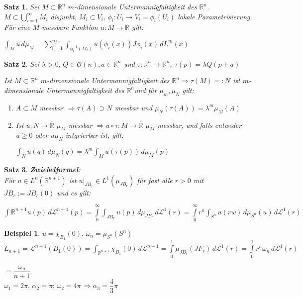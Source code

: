 \documentclass[11pt]{memoir}
\theoremstyle{changebreak}
\newtheorem{Beispiel}{Beispiel}[chapter]
\newtheorem{Satz}{Satz}[chapter]
\newcommand{\umgf}{$m$-dimensionale Untermannigfaltigkeit des $\mathbb R^n$}
\begin{document}
\begin{Satz}
Sei $M \subset \mathbb R^n$ \umgf. $M \subset \bigcup\limits_{i=1}^\infty M_i$ disjunkt, $M_i \subset V_i, \, \phi_i: U_i \rightarrow V_i = \phi_i(U_i)$ lokale Parametrisierung. Für eine $M$-messbare Funktion $u: M \rightarrow \overline{\mathbb R}$ gilt:
\begin{center}
	$\int_M u \, d\mu_M = \sum\limits_{i=1}^\infty \int_{\phi_i^{-1}(M_i)} u(\phi_i(x))J\phi_i(x) \, dL^m(x)$
\end{center}
\end{Satz}

\begin{Satz}
Sei $\lambda > 0, \, Q \in \mathscr O(n), a \in \mathbb R^n$ und $\tau: \mathbb R^n \rightarrow \mathbb R^n$, $\tau(p) = \lambda Q(p+a)$
\par
Ist $M \subset \mathbb R^n$ \umgf $\Rightarrow \tau(M) =: N$ ist \umgf und für $\mu_m, \mu_N$ gilt:
\begin{enumerate}
	\item $A \subset M$ messbar $\Rightarrow \tau(A) \supset N$ messbar und $\mu_N (\tau(A)) = \lambda^m \mu_M (A)$
	\item Ist $u: N \rightarrow \overline{\mathbb R}$ $\mu_M$-messbar $\Rightarrow u \circ \tau: M \rightarrow \overline{\mathbb R}$ $\mu_M$-messbar, und falls entweder $u \geq 0$ oder $u \mu_N$-intgrierbar ist, gilt:
	\begin{center}
		$\int_N u(q) \,d\mu_N(q) = \lambda^m \int_M u(\tau(p))\, d\mu_M(p)$
	\end{center}
\end{enumerate}
\end{Satz}

\begin{Satz}
\emph{\textbf{Zwiebelformel}}: \\
Für $u \in L^n(\mathbb R^{n+1})$ ist $u\lvert_{JB_r} \in L^1(\mu_{JB_r})$ für fast alle $r >0$ mit $JB_r:= JB_r(0)$ und es gilt:
\begin{center}
	$\int{\mathbb R^{n+1}} u(p) \, d\mathscr L^{n+1}(p) = \int\limits_0^\infty \int_{JB_r} u(p) \,d\mu_{JB_r} \,d\mathscr L^1(r) = \int\limits_0^\infty r^n \int_{S^n} u(rw)\,d\mu_{S^n}(u) \,d\mathscr L^1(r)$
\end{center}
\end{Satz}

\begin{Beispiel}
$u = \chi_{B_1}(0),\, \omega_n = \mu_{S^n} (S^n) $\\
$L_{n+1} = \mathscr L^{n+1}(B_1(0)) = \int_{\mathbb R^{n+1}} \chi_{B_1}(0) \,d \mathscr L^{n+1} = \int\limits_0^1 \mu_{JB_r}(JF_r) \,d \mathscr L^1(r) = \int\limits_0^1 r^n \omega_n \, d \mathscr L^1(r) $
\par
$= \dfrac{\omega_n}{n+1}$ \\
$\omega_1 = 2\pi, \, \alpha_2 = \pi; \, \omega_2 = 4\pi \, \Rightarrow \alpha_3 = \dfrac{4}{3}\pi$
\end{Beispiel}
\end{document}
